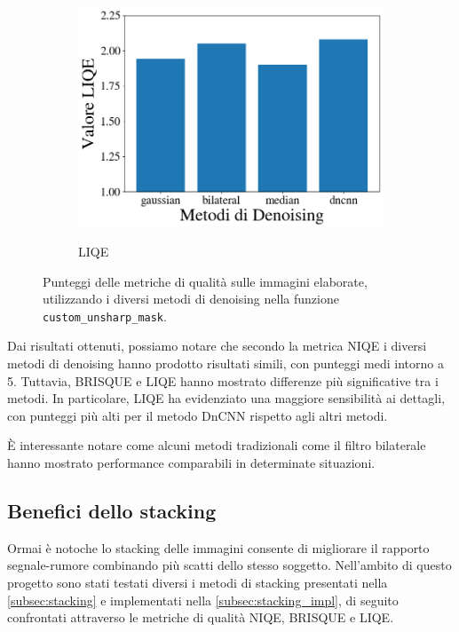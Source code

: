 \begin{figure}[H]
\begin{subfigure}[t]{0.32\textwidth}
        \label{fig:den_brisque}
    \end{subfigure}
    \hfill
    \begin{subfigure}[t]{0.32\textwidth}
        \centering
        \caption{LIQE}
        \includegraphics[width=\linewidth]{../assets/denoising_comparison_LIQE.png}
        \label{fig:den_liqe}
    \end{subfigure}
    \caption{Punteggi delle metriche di qualità sulle immagini elaborate, utilizzando i diversi metodi di denoising nella funzione \texttt{custom\_unsharp\_mask}.} \label{fig:confronto-denoising}
\end{figure}

Dai risultati ottenuti, possiamo notare che secondo la metrica NIQE i diversi metodi di denoising hanno prodotto risultati simili, con punteggi medi intorno a 5. Tuttavia, BRISQUE e LIQE hanno mostrato differenze più significative tra i metodi. In particolare, LIQE ha evidenziato una maggiore sensibilità ai dettagli, con punteggi più alti per il metodo DnCNN rispetto agli altri metodi.

È interessante notare come alcuni metodi tradizionali come il filtro bilaterale hanno mostrato performance comparabili in determinate situazioni.

\subsection{Benefici dello stacking} \label{subsec:analysis_stack}

Ormai è notoche lo stacking delle immagini consente di migliorare il rapporto segnale-rumore combinando più scatti dello stesso soggetto. Nell'ambito di questo progetto sono stati testati diversi i metodi di stacking presentati nella \cref{subsec:stacking} e implementati nella \cref{subsec:stacking_impl}, di seguito confrontati attraverso le metriche di qualità NIQE, BRISQUE e LIQE.

